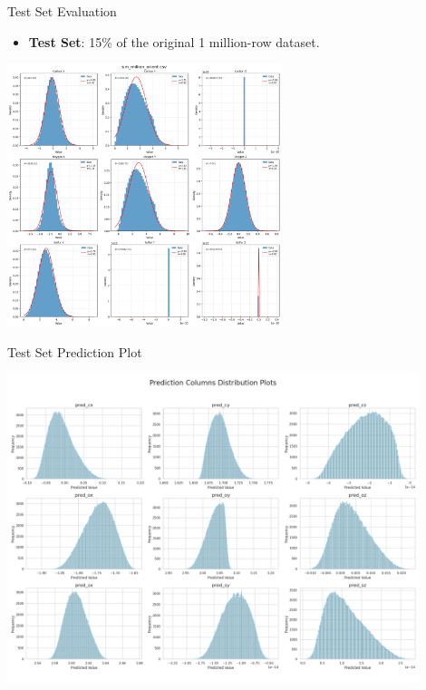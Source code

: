 \documentclass[9pt]{beamer}
\begin{document}
\begin{frame}{Test Set Evaluation}
  \begin{itemize}
    \item \textbf{Test Set}: 15\% of the original 1 million-row dataset.
  \end{itemize}
  \begin{center}
    \includegraphics[width=0.6\textwidth]{sim-stats.png}
  \end{center}
\end{frame}

\begin{frame}{Test Set Prediction Plot}
  \begin{center}
    \includegraphics[width=0.9\textwidth]{predictions_distribution_plots.png}
  \end{center}
\end{frame}
\end{document}
